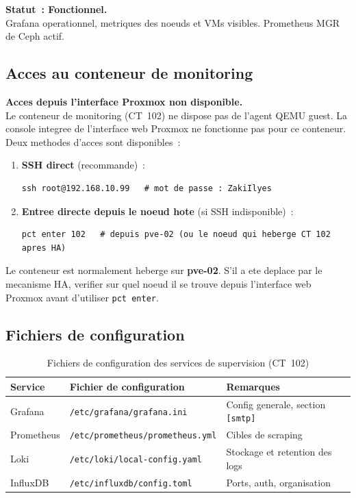 \documentclass[a4paper,11pt]{article}
\newenvironment{warnbox}{%
  \begin{mdframed}[linecolor=orange,backgroundcolor=orange!8,linewidth=1pt,
    leftmargin=0pt,rightmargin=0pt,innertopmargin=6pt,innerbottommargin=6pt]
}{%
  \end{mdframed}
}
\newenvironment{successbox}{%
  \begin{mdframed}[linecolor=vert,backgroundcolor=vert!7,linewidth=1pt,
    leftmargin=0pt,rightmargin=0pt,innertopmargin=6pt,innerbottommargin=6pt]
}{%
  \end{mdframed}
}
\begin{document}
\begin{successbox}
  \textbf{Statut~: Fonctionnel.}\\
  Grafana operationnel, metriques des noeuds et VMs visibles.
  Prometheus MGR de Ceph actif.
\end{successbox}

\subsection{Acces au conteneur de monitoring}

\begin{warnbox}
  \textbf{Acces depuis l'interface Proxmox non disponible.}\\
  Le conteneur de monitoring (CT~102) ne dispose pas de l'agent QEMU guest.
  La console integree de l'interface web Proxmox ne fonctionne pas pour ce conteneur.
  Deux methodes d'acces sont disponibles~:
\end{warnbox}

\begin{enumerate}[noitemsep]
  \item \textbf{SSH direct} (recommande)~:
\begin{lstlisting}[style=shellstyle]
ssh root@192.168.10.99   # mot de passe : ZakiIlyes
\end{lstlisting}
  \item \textbf{Entree directe depuis le noeud hote} (si SSH indisponible)~:
\begin{lstlisting}[style=shellstyle]
pct enter 102   # depuis pve-02 (ou le noeud qui heberge CT 102 apres HA)
\end{lstlisting}
\end{enumerate}

Le conteneur est normalement heberge sur \textbf{pve-02}. S'il a ete deplace par le
mecanisme HA, verifier sur quel noeud il se trouve depuis l'interface web Proxmox
avant d'utiliser \texttt{pct enter}.

\subsection{Fichiers de configuration}

\begin{table}[H]
  \caption{Fichiers de configuration des services de supervision (CT~102)}
  \centering
  \begin{tabular}{L{3cm}L{5.5cm}L{5cm}}
    \toprule
    \textbf{Service} & \textbf{Fichier de configuration} & \textbf{Remarques} \\
    \midrule
    Grafana     & \texttt{/etc/grafana/grafana.ini}              & Config generale, section \texttt{[smtp]} \\
    Prometheus  & \texttt{/etc/prometheus/prometheus.yml}         & Cibles de scraping \\
    Loki        & \texttt{/etc/loki/local-config.yaml}            & Stockage et retention des logs \\
    InfluxDB    & \texttt{/etc/influxdb/config.toml}              & Ports, auth, organisation \\
    \bottomrule
  \end{tabular}
\end{table}
\end{document}
